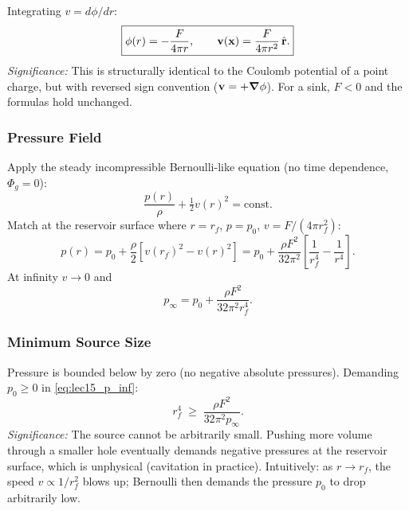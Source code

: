 \documentclass[../main.tex]{subfiles}
\begin{document}
Integrating $v=d\phi/dr$:
\begin{equation}
  \boxed{\phi(r) = -\frac{F}{4\pi r}, \qquad \mathbf{v}(\mathbf{x}) = \frac{F}{4\pi r^2}\,\hat{\mathbf{r}}.}
  \label{eq:lec15_phi_source}
\end{equation}
\textit{Significance:} This is structurally identical to the Coulomb potential of a point charge, but with reversed sign convention ($\mathbf{v}=+\grad\phi$). For a sink, $F<0$ and the formulas hold unchanged.

\subsubsection{Pressure Field}

Apply the steady incompressible Bernoulli-like equation (no time dependence, $\Phi_g=0$):
\begin{equation}
  \frac{p(r)}{\rho} + \tfrac{1}{2}v(r)^2 = \mathrm{const}.
  \label{eq:lec15_bern_source}
\end{equation}
Match at the reservoir surface where $r=r_f$, $p=p_0$, $v=F/(4\pi r_f^2)$:
\begin{equation}
  p(r) = p_0 + \frac{\rho}{2}\!\left[v(r_f)^2 - v(r)^2\right]
       = p_0 + \frac{\rho F^2}{32\pi^2}\!\left[\frac{1}{r_f^4} - \frac{1}{r^4}\right].
  \label{eq:lec15_p_source}
\end{equation}
At infinity $v\to 0$ and
\begin{equation}
  p_\infty = p_0 + \frac{\rho F^2}{32\pi^2 r_f^4}.
  \label{eq:lec15_p_inf}
\end{equation}

\subsubsection{Minimum Source Size}

Pressure is bounded below by zero (no negative absolute pressures). Demanding $p_0\ge 0$ in \eqref{eq:lec15_p_inf}:
\begin{equation}
  \boxed{r_f^4 \;\ge\; \frac{\rho F^2}{32\pi^2 p_\infty}.}
  \label{eq:lec15_rf_min}
\end{equation}
\textit{Significance:} The source cannot be arbitrarily small. Pushing more volume through a smaller hole eventually demands negative pressures at the reservoir surface, which is unphysical (cavitation in practice). Intuitively: as $r\to r_f$, the speed $v\propto 1/r_f^2$ blows up; Bernoulli then demands the pressure $p_0$ to drop arbitrarily low.

\end{document}
